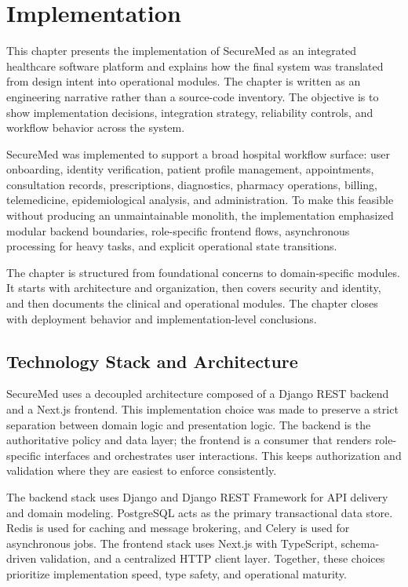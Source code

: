 \chapter{Implementation}\label{chap:implementation}\label{chapter-5-implementation}

This chapter presents the implementation of SecureMed as an integrated healthcare software platform and explains how the final system was translated from design intent into operational modules. The chapter is written as an engineering narrative rather than a source-code inventory. The objective is to show implementation decisions, integration strategy, reliability controls, and workflow behavior across the system.

SecureMed was implemented to support a broad hospital workflow surface: user onboarding, identity verification, patient profile management, appointments, consultation records, prescriptions, diagnostics, pharmacy operations, billing, telemedicine, epidemiological analysis, and administration. To make this feasible without producing an unmaintainable monolith, the implementation emphasized modular backend boundaries, role-specific frontend flows, asynchronous processing for heavy tasks, and explicit operational state transitions.

The chapter is structured from foundational concerns to domain-specific modules. It starts with architecture and organization, then covers security and identity, and then documents the clinical and operational modules. The chapter closes with deployment behavior and implementation-level conclusions.

\section{Technology Stack and Architecture}\label{51-technology-stack-and-architecture}

SecureMed uses a decoupled architecture composed of a Django REST backend and a Next.js frontend. This implementation choice was made to preserve a strict separation between domain logic and presentation logic. The backend is the authoritative policy and data layer; the frontend is a consumer that renders role-specific interfaces and orchestrates user interactions. This keeps authorization and validation where they are easiest to enforce consistently.

The backend stack uses Django and Django REST Framework for API delivery and domain modeling. PostgreSQL acts as the primary transactional data store. Redis is used for caching and message brokering, and Celery is used for asynchronous jobs. The frontend stack uses Next.js with TypeScript, schema-driven validation, and a centralized HTTP client layer. Together, these choices prioritize implementation speed, type safety, and operational maturity.

